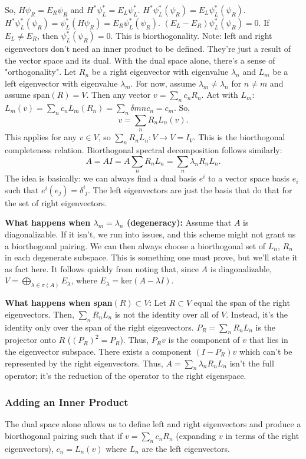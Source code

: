 \documentclass[11pt]{article}
\begin{document}
	So, $H\psi_R = E_R\psi_R$ and $H^*\psi^*_L= E_L \psi^*_L$. $H^*\psi^*_L(\psi_R) = E_L\psi^*_L(\psi_R).$ $H^*\psi^*_L(\psi_R)=\psi^*_L(H\psi_R)=E_R\psi^*_L(\psi_R)$. $(E_L-E_R)\psi_L^*(\psi_R)=0$. If $E_L\ne E_R$, then $\psi_L^*(\psi_R)=0$. This is biorthogonality. Note: left and right eigenvectors don't need an inner product to be defined. They're just a result of the vector space and its dual. With the dual space alone, there's a sense of "orthogonality".  Let $R_n$ be a right eigenvector with eigenvalue $\lambda_n$ and $L_m$ be a left eigenvector with eigenvalue $\lambda_m$. For now, assume $\lambda_m \ne \lambda_n$ for $n\ne m$ and assume span$(R)=V$. Then any vector $v=\sum_n c_n R_n$. Act with $L_m$: $L_m(v) = \sum_n c_n L_m(R_n) = \sum_n \delta{mn}c_n = c_m$. So,
	$$
		v = \sum_n R_n L_n(v).
	$$
	This applies for any $v\in V$, so $\sum_n R_n L_n : V\rightarrow V = I_V$. This is the biorthogonal completeness relation. Biorthogonal spectral decomposition follows similarly:
	$$
	A = AI = A \sum_n R_n L_n = \sum_n \lambda_n R_n L_n.
	$$
	The idea is basically: we can always find a dual basis $e^i$ to a vector space basis $e_i$ such that $e^i(e_j) = \delta^i_{\; j}$. The left eigenvectors are just the basis that do that for the set of right eigenvectors. 
	
	\textbf{What happens when $\lambda_m = \lambda_n$ (degeneracy):}
	Assume that $A$ is diagonalizable. If it isn't, we run into issues, and this scheme might not grant us a biorthogonal pairing. We can then always choose a biorthogonal set of $L_n$, $R_n$ in each degenerate subspace. This is something one must prove, but we'll state it as fact here. It follows quickly from noting that, since $A$ is diagonalizable, $V = \bigoplus_{\lambda\in \sigma(A)}E_\lambda$, where $E_\lambda=\text{ker}(A-\lambda I)$. 
	
	\textbf{What happens when span$(R)\subset V$:}
	Let $R\subset V$ equal the span of the right eigenvectors. Then, $\sum_n R_n L_n$ is not the identity over all of $V$. Instead, it's the identity only over the span of the right eigenvectors. $P_R = \sum_n R_n L_n$ is the projector onto $R$ ($(P_R)^2 = P_R$). Thus, $P_Rv$ is the component of $v$ that lies in the eigenvector subspace. There exists a component $(I-P_R)v$ which can't be represented by the right eigenvectors. Thus, $A=\sum_n\lambda_n R_n L_n$ isn't the full operator; it's the reduction of the operator to the right eigenspace. 
	
	\subsubsection*{Adding an Inner Product}
	The dual space alone allows us to define left and right eigenvectors and produce a biorthogonal pairing such that if $v = \sum_n c_n R_n$ (expanding $v$ in terms of the right eigenvectors), $c_n = L_n(v)$ where $L_n$ are the left eigenvectors.
	
\end{document}
